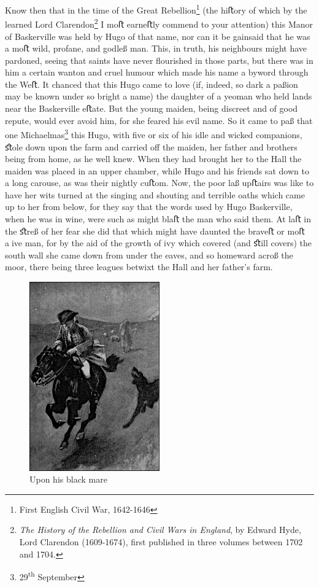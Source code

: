 \documentclass[paper=a5,BCOR=7mm,twoside,DIV=calc,12pt,usegeometry,openany,chapterprefix,endperiod,headings=big]{scrbook} %
\begin{document}
Know then that in the time of the Great Rebellion\footnote{First English Civil War, 1642-1646} (the hiﬅory of which by the learned Lord Clarendon\footnote{\textit{The History of the Rebellion and Civil Wars in England}, by Edward Hyde, Lord Clarendon (1609-1674), first published in three volumes between 1702 and 1704.} I moﬅ earneﬅly commend to your attention) this Manor of Baskerville was held by Hugo of that name, nor can it be gainsaid that he was a moﬅ wild, profane, and godleß man. This, in truth, his neighbours might have pardoned, seeing that saints have never ﬂourished in those parts, but there was in him a certain wanton and cruel humour which made his name a byword through the Weﬅ. It chanced that this Hugo came to love (if, indeed, so dark a paßion may be known under so bright a name) the daughter of a yeoman who held lands near the Baskerville eﬅate. But the young maiden, being discreet and of good repute, would ever avoid him, for she feared his evil name. So it came to paß that one Michaelmas\footnote{29\textsuperscript{th} September} this Hugo, with ﬁve or six of his idle and wicked companions, ﬆole down upon the farm and carried oﬀ the maiden, her father and brothers being from home, as he well knew. When they had brought her to the Hall the maiden was placed in an upper chamber, while Hugo and his friends sat down to a long carouse, as was their nightly cuﬅom. Now, the poor laß upﬅairs was like to have her wits turned at the singing and shouting and terrible oaths which came up to her from below, for they say that the words used by Hugo Baskerville, when he was in wine, were such as might blaﬅ the man who said them. At laﬅ in the ﬆreß of her fear she did that which might have daunted the braveﬅ or moﬅ aive man, for by the aid of the growth of ivy which covered (and ﬆill covers) the south wall she came down from under the eaves, and so homeward acroß the moor, there being three leagues betwixt the Hall and her father's farm.

\begin{figure}
\centering
\includegraphics[width=0.5\textwidth]{02_blackmare}
\caption{Upon his black mare}
\end{figure}
\end{document}
